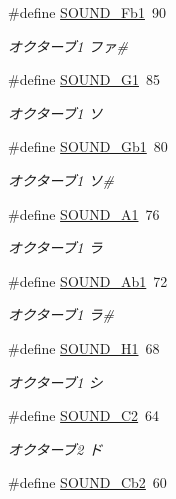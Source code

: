 \begin{DoxyCompactItemize}
\#define \hyperlink{sound_8h_adc081179e66a0f7fe8f58b07f0358ed8_adc081179e66a0f7fe8f58b07f0358ed8}{S\+O\+U\+N\+D\+\_\+\+Fb1}~90
\begin{DoxyCompactList}\small\item\em オクターブ1 ファ\# \end{DoxyCompactList}\item 
\#define \hyperlink{sound_8h_a077f7dc14c95e192d7edf3c8eb72c5da_a077f7dc14c95e192d7edf3c8eb72c5da}{S\+O\+U\+N\+D\+\_\+\+G1}~85
\begin{DoxyCompactList}\small\item\em オクターブ1 ソ \end{DoxyCompactList}\item 
\#define \hyperlink{sound_8h_af064bb5dbd237d2fe7e954ee31cd3ca4_af064bb5dbd237d2fe7e954ee31cd3ca4}{S\+O\+U\+N\+D\+\_\+\+Gb1}~80
\begin{DoxyCompactList}\small\item\em オクターブ1 ソ\# \end{DoxyCompactList}\item 
\#define \hyperlink{sound_8h_a0a5faefe8dfea062eb628bd9b6aba261_a0a5faefe8dfea062eb628bd9b6aba261}{S\+O\+U\+N\+D\+\_\+\+A1}~76
\begin{DoxyCompactList}\small\item\em オクターブ1 ラ \end{DoxyCompactList}\item 
\#define \hyperlink{sound_8h_acf1942377e486c3d28326ea144b0c9f0_acf1942377e486c3d28326ea144b0c9f0}{S\+O\+U\+N\+D\+\_\+\+Ab1}~72
\begin{DoxyCompactList}\small\item\em オクターブ1 ラ\# \end{DoxyCompactList}\item 
\#define \hyperlink{sound_8h_a779cc45580fd31304c432b2582e94953_a779cc45580fd31304c432b2582e94953}{S\+O\+U\+N\+D\+\_\+\+H1}~68
\begin{DoxyCompactList}\small\item\em オクターブ1 シ \end{DoxyCompactList}\item 
\#define \hyperlink{sound_8h_a041d01c58025c9f74835d33da716e51d_a041d01c58025c9f74835d33da716e51d}{S\+O\+U\+N\+D\+\_\+\+C2}~64
\begin{DoxyCompactList}\small\item\em オクターブ2 ド \end{DoxyCompactList}\item 
\#define \hyperlink{sound_8h_a2ea86474bf4acd9fa0b6cc36610a54db_a2ea86474bf4acd9fa0b6cc36610a54db}{S\+O\+U\+N\+D\+\_\+\+Cb2}~60

\end{DoxyCompactItemize}
